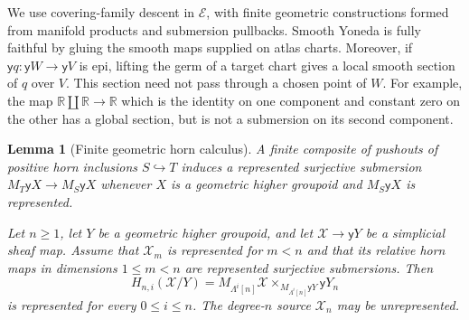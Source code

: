 \documentclass[12pt]{amsart}
\newtheorem{lem}[thm]{Lemma}
\theoremstyle{definition}
\theoremstyle{remark}
\numberwithin{equation}{section}
\newcommand{\R}{\mathbb R}
\newcommand{\E}{\mathcal E}
\newcommand{\y}{\mathsf y}
\begin{document}
We use covering-family descent in $\E$, with finite
geometric constructions formed from manifold products
and submersion pullbacks. Smooth Yoneda is fully faithful by
gluing the smooth maps supplied on atlas charts.
Moreover, if $\y q:\y W\to\y V$ is epi, lifting the
germ of a target chart gives a local smooth section of
$q$ over $V$. This section need not pass through a
chosen point of $W$. For example, the map
$\R\amalg\R\to\R$ which is the identity on one component
and constant zero on the other has a global section,
but is not a submersion on its second component.

\begin{lem}[Finite geometric horn calculus]
A finite composite of pushouts of positive horn inclusions
$S\hookrightarrow T$ induces a represented surjective
submersion $M_T\y X\to M_S\y X$ whenever $X$ is a
geometric higher groupoid and $M_S\y X$ is represented.
\label{lem:ordinary-geometric-matching}

Let $n\ge1$, let $Y$ be a geometric higher groupoid, and let
$\mathcal X\to\y Y$ be a simplicial sheaf map.
Assume that $\mathcal X_m$ is represented for $m<n$
and that its relative horn maps in dimensions
$1\le m<n$ are represented surjective submersions.
Then
\[
 H_{n,i}(\mathcal X/Y)
 =M_{\Lambda^i[n]}\mathcal X
   \times_{M_{\Lambda^i[n]}\y Y}\y Y_n
\]
is represented for every $0\le i\le n$.
The degree-$n$ source $\mathcal X_n$ may be unrepresented.
\end{lem}
\end{document}
